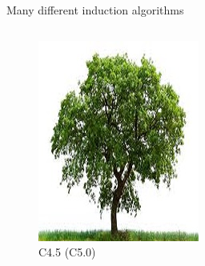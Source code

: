 \documentclass[english]{beamer}
\begin{document}
\begin{frame}{Many different induction algorithms}
	\begin{columns}
		\begin{column}{0.25\textwidth}
			\centering
			\begin{figure}
				\includegraphics[width=\textwidth]{figures/oak.jpg}
				\caption{C4.5 (C5.0)}
			\end{figure}
		\end{column}
		\begin{column}{0.25\textwidth}
			\centering
			\begin{figure}

\end{figure}
\end{column}
\end{columns}
\end{frame}
\end{document}
